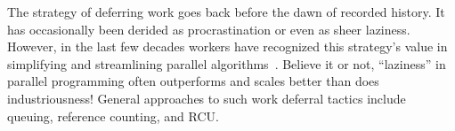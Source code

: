 

The strategy of deferring work goes back before the dawn of recorded
history. It has occasionally been derided as procrastination or
even as sheer laziness.
However, in the last few decades workers have recognized this strategy's value
in simplifying and streamlining parallel algorithms~\cite{Kung80,HMassalinPhD}.
Believe it or not, ``laziness'' in parallel programming often outperforms and
scales better than does industriousness!
General approaches to such work deferral tactics include
queuing, reference counting, and RCU.






